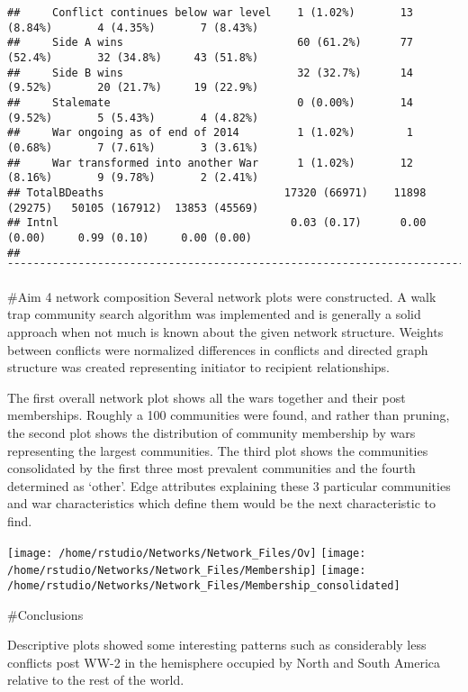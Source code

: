 \documentclass[
]{article}
\begin{document}
\begin{verbatim}
##     Conflict continues below war level    1 (1.02%)       13 (8.84%)       4 (4.35%)       7 (8.43%)   
##     Side A wins                           60 (61.2%)      77 (52.4%)       32 (34.8%)     43 (51.8%)   
##     Side B wins                           32 (32.7%)      14 (9.52%)       20 (21.7%)     19 (22.9%)   
##     Stalemate                             0 (0.00%)       14 (9.52%)       5 (5.43%)       4 (4.82%)   
##     War ongoing as of end of 2014         1 (1.02%)        1 (0.68%)       7 (7.61%)       3 (3.61%)   
##     War transformed into another War      1 (1.02%)       12 (8.16%)       9 (9.78%)       2 (2.41%)   
## TotalBDeaths                            17320 (66971)    11898 (29275)   50105 (167912)  13853 (45569) 
## Intnl                                    0.03 (0.17)      0.00 (0.00)     0.99 (0.10)     0.00 (0.00)  
## ¯¯¯¯¯¯¯¯¯¯¯¯¯¯¯¯¯¯¯¯¯¯¯¯¯¯¯¯¯¯¯¯¯¯¯¯¯¯¯¯¯¯¯¯¯¯¯¯¯¯¯¯¯¯¯¯¯¯¯¯¯¯¯¯¯¯¯¯¯¯¯¯¯¯¯¯¯¯¯¯¯¯¯¯¯¯¯¯¯¯¯¯¯¯¯¯¯¯¯¯¯¯
\end{verbatim}

\#Aim 4 network composition Several network plots were constructed. A
walk trap community search algorithm was implemented and is generally a
solid approach when not much is known about the given network structure.
Weights between conflicts were normalized differences in conflicts and
directed graph structure was created representing initiator to recipient
relationships.

The first overall network plot shows all the wars together and their
post memberships. Roughly a 100 communities were found, and rather than
pruning, the second plot shows the distribution of community membership
by wars representing the largest communities. The third plot shows the
communities consolidated by the first three most prevalent communities
and the fourth determined as `other'. Edge attributes explaining these 3
particular communities and war characteristics which define them would
be the next characteristic to find.

\texttt{[image: /home/rstudio/Networks/Network\_Files/Ov]}
\texttt{[image: /home/rstudio/Networks/Network\_Files/Membership]}
\texttt{[image: /home/rstudio/Networks/Network\_Files/Membership\_consolidated]}

\#Conclusions

Descriptive plots showed some interesting patterns such as considerably
less conflicts post WW-2 in the hemisphere occupied by North and South
America relative to the rest of the world.\\
\end{document}
